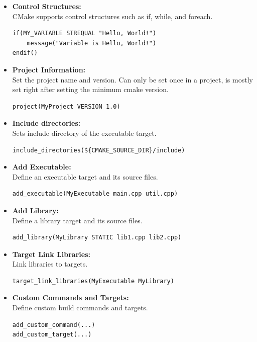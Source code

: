 \documentclass{beamer}
\begin{document}
\begin{frame}[fragile]
    \begin{itemize}
        \item \textbf{Control Structures:} \\
        CMake supports control structures such as if, while, and foreach.
        \begin{verbatim}
if(MY_VARIABLE STREQUAL "Hello, World!")
    message("Variable is Hello, World!")
endif()
        \end{verbatim}
        \item \textbf{Project Information:} \\
        Set the project name and version. Can only be set once in a project, is mostly set right after setting the minimum cmake version.
        \begin{verbatim}
project(MyProject VERSION 1.0)
        \end{verbatim}
        \item \textbf{Include directories:} \\
        Sets include directory of the executable target.
        \begin{verbatim}
include_directories(${CMAKE_SOURCE_DIR}/include)
        \end{verbatim}
    \end{itemize}
\end{frame}

\begin{frame}[fragile]
    \begin{itemize}
        \item \textbf{Add Executable:} \\
        Define an executable target and its source files.
        \begin{verbatim}
add_executable(MyExecutable main.cpp util.cpp)
        \end{verbatim}
        \item \textbf{Add Library:} \\
        Define a library target and its source files.
        \begin{verbatim}
add_library(MyLibrary STATIC lib1.cpp lib2.cpp)
        \end{verbatim}
        \item \textbf{Target Link Libraries:} \\
        Link libraries to targets.
        \begin{verbatim}
target_link_libraries(MyExecutable MyLibrary)
        \end{verbatim}
        \item \textbf{Custom Commands and Targets:} \\
        Define custom build commands and targets.
        \begin{verbatim}
add_custom_command(...)
add_custom_target(...)
        \end{verbatim}
    \end{itemize}
\end{frame}
\end{document}
